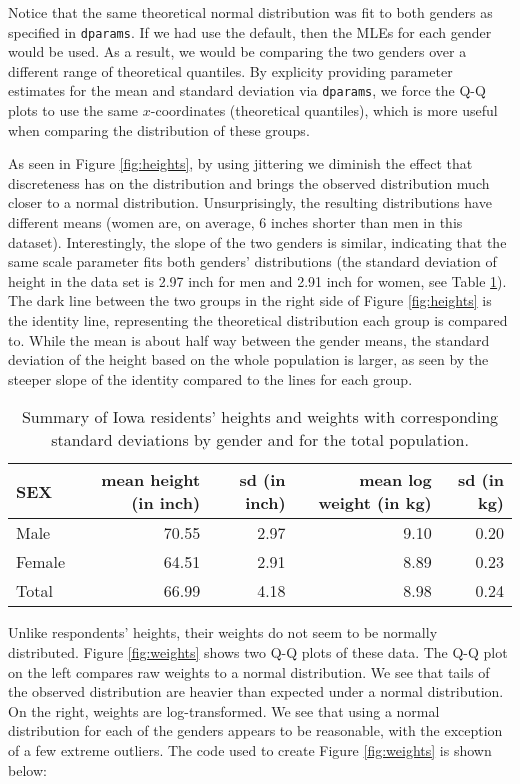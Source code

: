 Notice that the same theoretical normal distribution was fit to both
genders as specified in \texttt{dparams}. If we had use the default,
then the MLEs for each gender would be used. As a result, we would be
comparing the two genders over a different range of theoretical
quantiles. By explicity providing parameter estimates for the mean and
standard deviation via \texttt{dparams}, we force the Q-Q plots to use
the same \(x\)-coordinates (theoretical quantiles), which is more useful
when comparing the distribution of these groups.

As seen in Figure \ref{fig:heights}, by using jittering we diminish the
effect that discreteness has on the distribution and brings the observed
distribution much closer to a normal distribution. Unsurprisingly, the
resulting distributions have different means (women are, on average, 6
inches shorter than men in this dataset). Interestingly, the slope of
the two genders is similar, indicating that the same scale parameter
fits both genders' distributions (the standard deviation of height in
the data set is 2.97 inch for men and 2.91 inch for women, see Table
\ref{tab:heights}). The dark line between the two groups in the right
side of Figure \ref{fig:heights} is the identity line, representing the
theoretical distribution each group is compared to. While the mean is
about half way between the gender means, the standard deviation of the
height based on the whole population is larger, as seen by the steeper
slope of the identity compared to the lines for each group.

\begin{table}

\caption{\label{tab:heights-table}Summary of Iowa residents' heights and weights with corresponding standard deviations by gender and for the total population.\label{tab:heights}}
\centering
\begin{tabular}[t]{lrrrr}
\toprule
SEX & mean height (in inch) & sd (in inch) & mean log weight (in kg) & sd (in kg)\\
\midrule
Male & 70.55 & 2.97 & 9.10 & 0.20\\
Female & 64.51 & 2.91 & 8.89 & 0.23\\
Total & 66.99 & 4.18 & 8.98 & 0.24\\
\bottomrule
\end{tabular}
\end{table}

Unlike respondents' heights, their weights do not seem to be normally
distributed. Figure \ref{fig:weights} shows two Q-Q plots of these data.
The Q-Q plot on the left compares raw weights to a normal distribution.
We see that tails of the observed distribution are heavier than expected
under a normal distribution. On the right, weights are log-transformed.
We see that using a normal distribution for each of the genders appears
to be reasonable, with the exception of a few extreme outliers. The code
used to create Figure \ref{fig:weights} is shown below:

